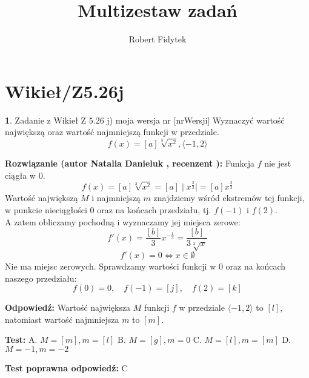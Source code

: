 \documentclass[12pt, a4paper]{article}
\title{Multizestaw zadań}
\author{Robert Fidytek}
\date{}
\theoremstyle{definition} %
\newtheorem{zad}{}
\newcommand{\kategoria}[1]{\section{#1}} %
\newcommand{\zadStart}[1]{\begin{zad}#1\newline} %
\newcommand{\zadStop}{\end{zad}}   %
\newcommand{\rozwStart}[2]{\noindent \textbf{Rozwiązanie (autor #1 , recenzent #2): }\newline} %
\newcommand{\rozwStop}{\newline}                                            %
\newcommand{\odpStart}{\noindent \textbf{Odpowiedź:}\newline}    %
\newcommand{\odpStop}{\newline}                                             %
\newcommand{\testStart}{\noindent \textbf{Test:}\newline} %
\newcommand{\testStop}{\newline} %
\newcommand{\kluczStart}{\noindent \textbf{Test poprawna odpowiedź:}\newline} %
\newcommand{\kluczStop}{\newline} %
\begin{document}
\maketitle

\kategoria{Wikieł/Z5.26j}

\zadStart{Zadanie z Wikieł Z 5.26 j) moja wersja nr [nrWersji]}
Wyznaczyć wartość największą oraz wartość najmniejszą funkcji w przedziale. 
$$f(x) = [a]\sqrt[3]{x^2 }, \langle-1,2\rangle$$
\zadStop

\rozwStart{Natalia Danieluk}{}
Funkcja $f$ nie jest ciągła w $0$. 
$$ f(x) = [a]\sqrt[3]{x^2} = [a]\mid x^{\frac{2}{3}} \mid = [a]x^{\frac{2}{3}} $$
Wartość największą $M$ i najmniejszą $m$ znajdziemy wśród ekstremów tej funkcji, w punkcie nieciągłości $0$ oraz na końcach przedziału, tj. $f(-1)$ i $f(2)$. \\
A zatem obliczamy pochodną i wyznaczamy jej miejsca zerowe:
$$ f'(x) =  \frac{[b]}{3}x^{-\frac{1}{3}} =  \frac{[b]}{3\sqrt[3]{x}} $$
$$ f'(x) = 0 \Leftrightarrow x \in \emptyset $$ 
Nie ma miejsc zerowych. Sprawdzamy wartości funkcji w $0$ oraz na końcach naszego przedziału: \\
$$ f(0) = 0,\quad f(-1) = [j],\quad f(2) = [k] $$
\rozwStop

\odpStart
Wartość największa $M$ funkcji $f$ w przedziale $\langle-1,2\rangle$ to $[l]$, natomiast wartość najmniejsza $m$ to $[m]$.
\odpStop

\testStart
A. $M=[m], m=[l]$
B. $M=[g], m=0$
C. $M=[l], m=[m]$
D. $M=-1, m=-2$
\testStop

\kluczStart
C
\kluczStop
\end{document}
